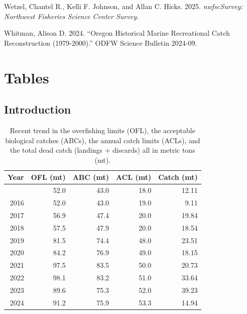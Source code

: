 \documentclass[
]{scrartcl}
\newlength{\cslhangindent}
\newenvironment{CSLReferences}[2] %
 {\begin{list}{}{%
  \setlength{\itemindent}{0pt}
  \setlength{\leftmargin}{0pt}
  \setlength{\parsep}{0pt}
  \ifodd #1
   \setlength{\leftmargin}{\cslhangindent}
   \setlength{\itemindent}{-1\cslhangindent}
  \fi
  \setlength{\itemsep}{#2\baselineskip}}}
 {\end{list}}
\begin{document}
\begin{CSLReferences}{1}{0}
Wetzel, Chantel R., Kelli F. Johnson, and Allan C. Hicks. 2025.
\emph{nwfscSurvey: Northwest Fisheries Science Center Survey}.

Whitman, Alison D. 2024. {``Oregon Historical Marine Recreational Catch
Reconstruction (1979-2000).''} ODFW Science Bulletin 2024-09.

\end{CSLReferences}

\newpage{}

\section{Tables}\label{tables}

\subsection{Introduction}\label{introduction-1}

\begingroup
\fontsize{9.0pt}{10.8pt}\selectfont

\begin{longtable}{rrrrr}

\caption{\label{tbl-yelloweye_management}Recent trend in the overfishing
limits (OFL), the acceptable biological catches (ABCs), the annual catch
limits (ACLs), and the total dead catch (landings + discards) all in
metric tons (mt).}

\tabularnewline

\toprule
Year & OFL (mt) & ABC (mt) & ACL (mt) & Catch (mt) \\ 
\midrule\addlinespace[2.5pt]
2015 & 52.0 & 43.0 & 18.0 & 12.11 \\ 
2016 & 52.0 & 43.0 & 19.0 & 9.11 \\ 
2017 & 56.9 & 47.4 & 20.0 & 19.84 \\ 
2018 & 57.5 & 47.9 & 20.0 & 18.54 \\ 
2019 & 81.5 & 74.4 & 48.0 & 23.51 \\ 
2020 & 84.2 & 76.9 & 49.0 & 18.15 \\ 
2021 & 97.5 & 83.5 & 50.0 & 20.73 \\ 
2022 & 98.1 & 83.2 & 51.0 & 33.64 \\ 
2023 & 89.6 & 75.3 & 52.0 & 39.23 \\ 
2024 & 91.2 & 75.9 & 53.3 & 14.94 \\ 
\bottomrule

\end{longtable}
\end{document}

